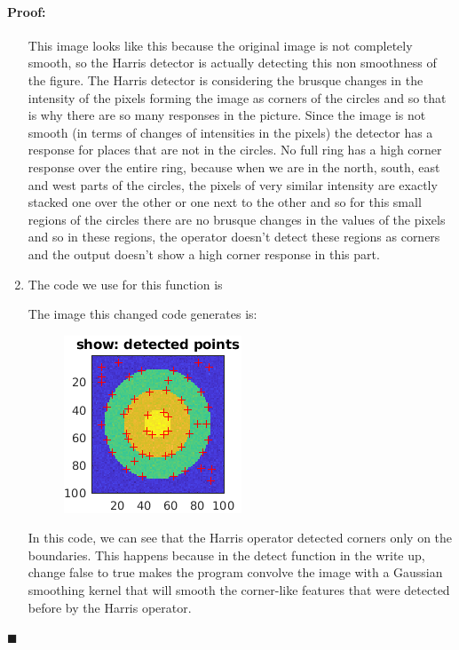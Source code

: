 \documentclass[12pt]{article}
\newenvironment{proof}{\paragraph{Proof: }}{\hfill$\blacksquare$}
\begin{document}
\begin{proof}
\begin{enumerate}
This image looks like this because the original image is not completely smooth, so the Harris detector is actually detecting this non smoothness of the figure. The Harris detector is considering the brusque changes in the intensity of the pixels forming the image as corners of the circles and so that is why there are so many responses in the picture. Since the image is not smooth (in terms of changes of intensities in the pixels) the detector has a response for places that are not in the circles. No full ring has a high corner response over the entire ring, because when we are in the north, south, east and west parts of the circles, the pixels of very similar intensity  are  exactly stacked one over the other or one next to the other and so for this small regions of the circles there are no brusque changes in the values of the pixels and so in these regions, the operator doesn't detect these regions as corners and the output doesn't show a high corner response in this part. 

\item The code we use for this function is



The image this changed code generates is:

\begin{figure}[H]
\begin{center}
\advance\leftskip-3cm
\advance\rightskip-3cm
\includegraphics[keepaspectratio=true, scale = 1]{detect_rings.png}
\caption{}
\label{visina8}
\end{center}
\end{figure}

In this code, we can see that the Harris operator detected corners only on the boundaries. This happens because in the detect function in the write up, change false to true makes the program convolve the image with a Gaussian smoothing kernel that will smooth the corner-like features that were detected before by the Harris operator. 


\end{enumerate}
\end{proof}
\end{document}
